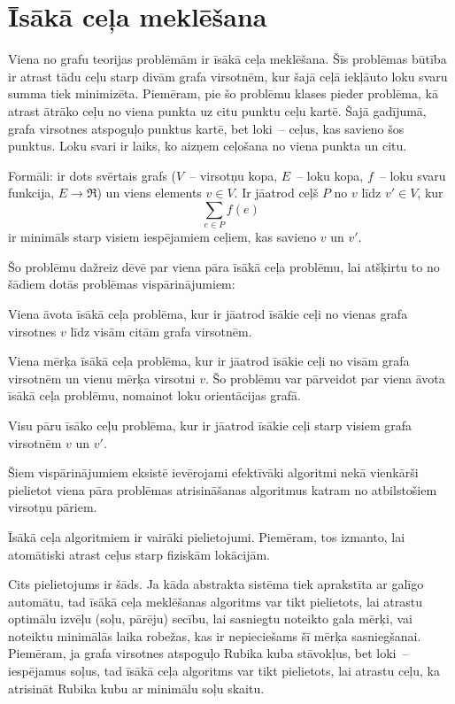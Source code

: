 \section{Īsākā ceļa meklēšana}
Viena no grafu teorijas problēmām ir īsākā ceļa meklēšana. Šīs problēmas
būtība ir atrast tādu ceļu starp divām grafa virsotnēm, kur šajā ceļā iekļāuto
loku svaru summa tiek minimizēta. Piemēram, pie šo problēmu klases pieder problēma,
kā atrast ātrāko ceļu no viena punkta uz citu punktu ceļu kartē. Šajā gadījumā,
grafa virsotnes atspoguļo punktus kartē, bet loki~-- ceļus, kas savieno šos punktus.
Loku svari ir laiks, ko aizņem ceļošana no viena punkta un citu.

Formāli: ir dots svērtais grafs ($V$~-- virsotņu kopa, $E$~-- loku kopa, $f$~--
loku svaru funkcija, $E \rightarrow \Re$) un viens elements $v \in V$. Ir jāatrod ceļš
$P$ no $v$ līdz $v' \in V$, kur
\[\sum_{e\in P} f(e)\]
ir minimāls starp visiem iespējamiem ceļiem, kas savieno $v$ un $v'$.

Šo problēmu dažreiz dēvē par viena pāra īsākā ceļa problēmu, lai atšķirtu to no
šādiem dotās problēmas vispārinājumiem:
\begin{dotlist}
	\item Viena āvota īsākā ceļa problēma, kur ir jāatrod īsākie ceļi no vienas
		grafa virsotnes $v$ līdz visām citām grafa virsotnēm.
	\item Viena mērķa īsākā ceļa problēma, kur ir jāatrod īsākie ceļi no visām grafa
		virsotnēm un vienu mērķa virsotni $v$. Šo problēmu var pārveidot par viena
		āvota īsākā ceļa problēmu, nomainot loku orientācijas grafā.
	\item Visu pāru īsāko ceļu problēma, kur ir jāatrod īsākie ceļi starp visiem
		grafa virsotnēm $v$ un $v'$.
\end{dotlist}

Šiem vispārinājumiem eksistē ievērojami efektīvāki algoritmi nekā vienkārši pielietot
viena pāra problēmas atrisināšanas algoritmus katram no atbilstošiem virsotņu pāriem.

Īsākā ceļa algoritmiem ir vairāki pielietojumi. Piemēram, tos izmanto, lai atomātiski
atrast ceļus starp fiziskām lokācijām.

Cits pielietojums ir šāds. Ja kāda abstrakta sistēma tiek aprakstīta ar galīgo
automātu, tad īsākā ceļa meklēšanas algoritms var tikt pielietots, lai atrastu
optimālu izvēļu (soļu, pārēju) secību, lai sasniegtu noteikto gala mērķi, vai noteiktu
minimālās laika robežas, kas ir nepieciešams šī mērķa sasniegšanai. Piemēram, ja
grafa virsotnes atspoguļo Rubika kuba stāvokļus, bet loki~-- iespējamus soļus, tad
īsākā ceļa algoritms var tikt pielietots, lai atrastu ceļu, ka atrisināt Rubika
kubu ar minimālu soļu skaitu.

